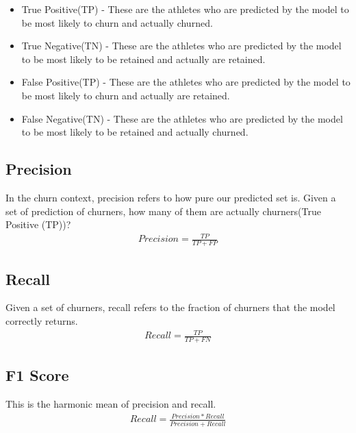 \documentclass[
10pt, %
a4paper, %
oneside, %
headinclude,footinclude, %
BCOR5mm, %
]{scrartcl}
\begin{document}
\begin{itemize}
\item True Positive(TP) - These are the athletes who are predicted by the model to be most likely to churn and actually churned.
\item True Negative(TN) - These are the athletes who are predicted by the model to be most likely to be retained  and actually are retained.
\item False Positive(TP) - These are the athletes who are predicted by the model to be most likely to churn and actually are retained.
\item False Negative(TN) - These are the athletes who are predicted by the model to be most likely to be retained  and actually churned.

\end{itemize}

\subsection{Precision}
In the churn context, precision refers to how pure our predicted set is. Given a set of prediction of churners, how many of them are actually churners(True Positive (TP))?
\begin{align*}
  Precision = \frac{TP}{TP+FP}
\end{align*}

\subsection{Recall}
Given a set of churners, recall refers to the fraction of churners that the model correctly returns.
\begin{align*}
  Recall = \frac{TP}{TP+FN}
\end{align*}

\subsection{F1 Score}

This is the harmonic mean of precision and recall. 
\begin{align*}
  Recall = \frac{Precision * Recall}{Precision + Recall}
\end{align*}


\end{document}
